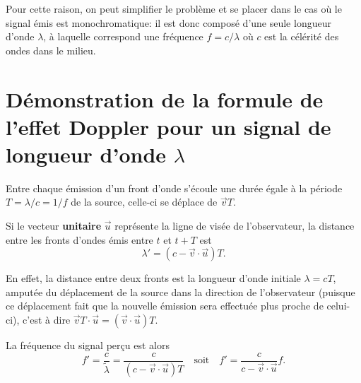 \documentclass{article}
\begin{document}
Pour cette raison, on peut simplifier le problème et se placer dans le cas où le signal émis est monochromatique: il est donc composé d'une seule longueur d'onde $\lambda$, à laquelle correspond une fréquence $f = c/\lambda$ où $c$ est la célérité des ondes dans le milieu.

\section{Démonstration de la formule de l'effet Doppler pour un signal de longueur d'onde $\lambda$}

Entre chaque émission d'un front d'onde s'écoule une durée égale à la période $T=\lambda/c=1/f$ de la source, celle-ci se déplace de $\vec v T$.

\begin{center}
\end{center}

Si le vecteur \textbf{unitaire} $\vec u$ représente la ligne de visée de l'observateur, la distance entre les fronts d'ondes émis entre $t$ et $t+T$ est 
\begin{equation}\boxed{
\lambda' = (c-\vec v\cdot\vec u)T.}
\end{equation}

En effet, la distance entre deux fronts est la longueur d'onde initiale $\lambda = cT$, amputée du déplacement de la source dans la direction de l'observateur (puisque ce déplacement fait que la nouvelle émission sera effectuée plus proche de celui-ci), c'est à dire $\vec v T \cdot \vec u = (\vec v \cdot \vec u)T$.

\begin{center}
\end{center}

La fréquence du signal perçu est alors
\begin{equation}
	f' = \frac{c}{\tilde{\lambda}} = \frac{c}{(c-\vec v \cdot \vec u)T}\quad\text{soit}\quad
	\boxed{f' = \frac{c}{c-\vec v\cdot\vec u}f.}
\end{equation}
\end{document}
